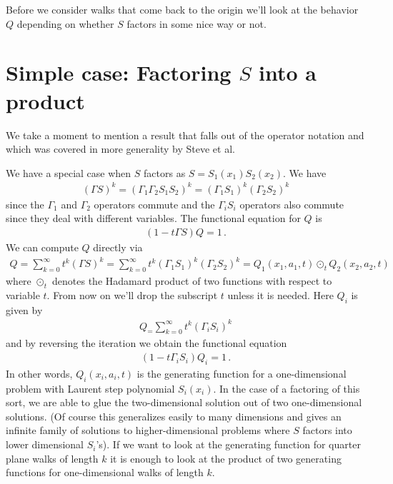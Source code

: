 Before we consider walks that come back to the origin we'll look at the behavior $Q$ depending on whether $S$ factors in some nice way or not.

\section{Simple case: Factoring $S$ into a product}

We take a moment to mention a result that falls out of the operator notation and which was covered in more generality by Steve et al. 
\begin{example}
We have a special case when $S$ factors as $S = S_1(x_1)S_2(x_2)$. We have
\begin{align}
	 (\Gamma S)^k = (\Gamma_1\Gamma_2S_1S_2)^k = (\Gamma_1S_1)^k(\Gamma_2S_2)^k
\end{align}
since the $\Gamma _1$ and $\Gamma _2$ operators commute and the $\Gamma _iS_i$ operators also commute since they deal with different variables. The functional equation for $Q$ is
\begin{align}
	(1-t\Gamma S)Q = 1\,.
\end{align}
We can compute $Q$ directly via 
\begin{align}
	Q = \sum_{k = 0}^{\infty} t^k (\Gamma S)^k = \sum_{k = 0}^{\infty} t^k (\Gamma_1S_1)^k(\Gamma_2S_2)^k = Q_1(x_1, a_1,t) \odot_t Q_2(x_2,a_2,t)
\end{align}
where $\odot_t$ denotes the Hadamard product of two functions with respect to variable $t$. From now on we'll drop the subscript $t$ unless it is needed. Here $Q_i$ is given by
\begin{align}
	Q_ = \sum_{k = 0}^{\infty} t^k (\Gamma_iS_i)^k
\end{align}
and by reversing the iteration we obtain the functional equation
\begin{align}
	(1-t\Gamma_iS_i)Q_i = 1\,.
\end{align}
In other words, $Q_i(x_i,a_i,t)$ is the generating function for a one-dimensional problem with Laurent step polynomial $S_i(x_i)$. In the case of a factoring of this sort, we are able to glue the two-dimensional solution out of two one-dimensional solutions. (Of course this generalizes easily to many dimensions and gives an infinite family of solutions to higher-dimensional problems where $S$ factors into lower dimensional $S_i$'s). If we want to look at the generating function for quarter plane walks of length $k$ it is enough to look at the product of two generating functions for one-dimensional walks of length $k$.
\end{example}
